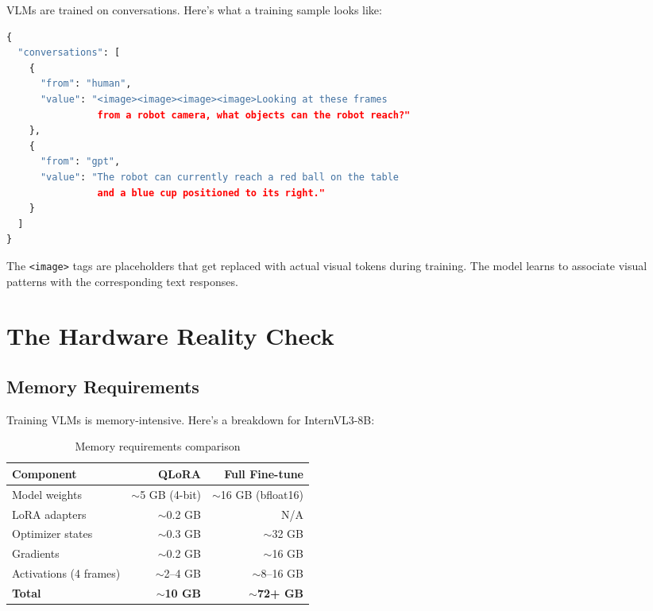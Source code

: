 \documentclass[11pt,a4paper]{article}
\begin{document}
VLMs are trained on conversations. Here's what a training sample looks like:

\begin{lstlisting}[language=Python,caption=Conversation format for VLM training]
{
  "conversations": [
    {
      "from": "human", 
      "value": "<image><image><image><image>Looking at these frames 
                from a robot camera, what objects can the robot reach?"
    },
    {
      "from": "gpt", 
      "value": "The robot can currently reach a red ball on the table 
                and a blue cup positioned to its right."
    }
  ]
}
\end{lstlisting}

The \texttt{<image>} tags are placeholders that get replaced with actual visual tokens during training. The model learns to associate visual patterns with the corresponding text responses.

\section{The Hardware Reality Check}

\subsection{Memory Requirements}

Training VLMs is memory-intensive. Here's a breakdown for InternVL3-8B:

\begin{table}[H]
\centering
\begin{tabular}{@{}lrr@{}}
\toprule
\textbf{Component} & \textbf{QLoRA} & \textbf{Full Fine-tune} \\
\midrule
Model weights & $\sim$5 GB (4-bit) & $\sim$16 GB (bfloat16) \\
LoRA adapters & $\sim$0.2 GB & N/A \\
Optimizer states & $\sim$0.3 GB & $\sim$32 GB \\
Gradients & $\sim$0.2 GB & $\sim$16 GB \\
Activations (4 frames) & $\sim$2--4 GB & $\sim$8--16 GB \\
\midrule
\textbf{Total} & \textbf{$\sim$10 GB} & \textbf{$\sim$72+ GB} \\
\bottomrule
\end{tabular}
\caption{Memory requirements comparison}
\end{table}
\end{document}
